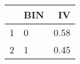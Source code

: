 \begin{table}[ht]
\centering
\begin{tabular}{rlr}
  \hline
 & BIN & IV \\ 
  \hline
1 & 0 & 0.58 \\ 
  2 & 1 & 0.45 \\ 
   \hline
\end{tabular}
\end{table}
